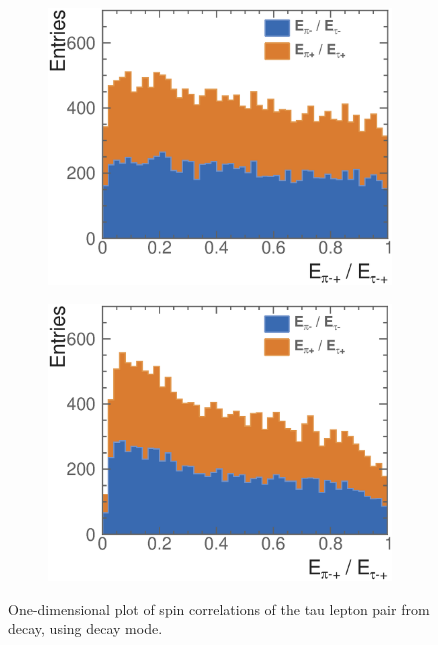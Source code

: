 \begin{figure}[htbp]
\centering %
\begin{subfigure}[b]{0.45\textwidth}
  \includegraphics[width=\textwidth]{tau/NoTimeAnalysis/1DMC}
  \caption{}
  \label{fig:TauSpin1DMC}
\end{subfigure}
\begin{subfigure}[b]{0.45\textwidth}
  \includegraphics[width=\textwidth]{tau/NoTimeAnalysis/1DrecoNoOverflow}
  \caption{}
  \label{fig:TauSpin1Dreco}
\end{subfigure}
\caption[One-dimensional plot of spin correlations of the tau lepton pair from \PZ decay, using \decayPionShort decay mode.]
{One-dimensional plot of spin correlations of the tau lepton pair from \PZ decay, using \decayPionShort decay mode.}
\label{fig:TauSpin1D}
\end{figure}

